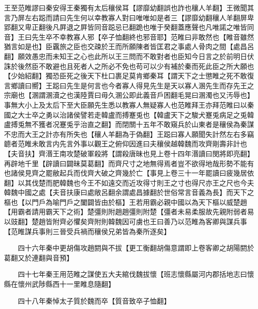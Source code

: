 王至范睢謬曰秦安得王秦獨有太后穰侯耳【謬靡幼翻誤也詐也穰人羊翻】王微聞其言乃屏左右跽而請曰先生何以幸教寡人對曰唯唯如是者三【謬靡幼翻穰人羊翻屏卑郢翻又卑正翻後凡屛退之屛皆同音跽忌已翻跪也唯于癸翻蓋應聲也凡唯諾之唯皆同音】王曰先生卒不幸教寡人邪【卒子恤翻終也邪音耶】范睢曰非敢然也【睢音雖然猶言如是也】臣覊旅之臣也交疎於王而所願陳者皆匡君之事處人骨肉之間【處昌呂翻】願效愚忠而未知王之心也此所以王三問而不敢對者也臣知今日言之於前明日伏誅於後然臣不敢避也且死者人之所必不免也苟可以少有補於秦而死此臣之所大願也【少始紹翻】獨恐臣死之後天下杜口裹足莫肯鄉秦耳【謂天下之士懲睢之死不敢復言鄉讀曰嚮】王跽曰先生是何言也今者寡人得見先生是天以寡人溷先生而存先王之宗廟也【溷謂溷瀆之也漢陸賈曰毋久溷公即此義音戶困翻毛晃曰溷濁也又汚辱也】事無大小上及太后下至大臣願先生悉以教寡人無疑寡人也范睢拜王亦拜范睢曰以秦國之大士卒之勇以治諸侯譬若走韓盧而搏蹇兎也【韓盧天下之駿犬蹇兎病足之兎韓盧搏兎無不獲者况蹇兎乎治直之翻】而閉關十五年不敢窺兵於山東者是穰侯為秦謀不忠而大王之計亦有所失也【穰人羊翻為于偽翻】王跽曰寡人願聞失計然左右多竊聼者范睢未敢言内先言外事以觀王之俯仰因進曰夫穰侯越韓魏而攻齊剛壽非計也【夫音扶】齊湣王南攻楚破軍殺將【謂殺唐昧也見上卷十四年湣讀曰閔將即亮翻】再辟地千里【辟讀曰闢昧莫葛翻】而齊尺寸之地無得焉者豈不欲得地哉形勢不能有也諸侯見齊之罷敝起兵而伐齊大破之齊幾於亡【事見上卷三十一年罷讀曰疲幾居依翻】以其伐楚而肥韓魏也今王不如遠交而近攻得寸則王之寸也得尺亦王之尺也今夫韓魏中國之處【夫音扶康曰處敞呂翻余謂處昌據翻於世俗常言音義為長】而天下之樞也【以門戶為喻門戶之闔闢皆由於樞】王若用霸必親中國以為天下樞以威楚趙【用霸者請用霸天下之術】楚彊則附趙趙彊則附楚【彊者未易柔服故先親附弱者易以豉翻】楚趙皆附齊必懼矣齊附則韓魏因可虜也王曰善乃以范睢為客卿與謀兵事【范睢謀兵事則三晉受兵禍而穰侯兄弟皆為秦所逐矣】

　　四十六年秦中更胡傷攻趙閼與不拔【更工衡翻胡傷意謂即上卷客卿之胡陽閼於葛翻又於連翻與音預】

　　四十七年秦王用范睢之謀使五大夫綰伐魏拔懷【班志懷縣屬河内郡括地志曰懷縣在懷州武陟縣西十一里睢息隨翻】

　　四十八年秦悼太子質於魏而卒【質音致卒子恤翻】

